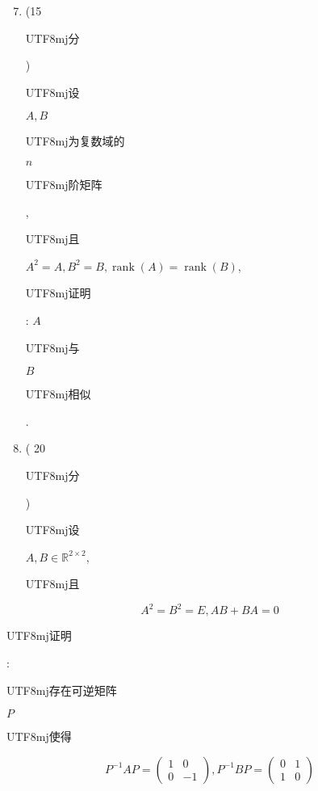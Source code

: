 \documentclass[10pt]{article}
\begin{document}
\begin{enumerate}
  \setcounter{enumi}{6}
  \item (15 \begin{CJK}{UTF8}{mj}分\end{CJK}) \begin{CJK}{UTF8}{mj}设\end{CJK} $A, B$ \begin{CJK}{UTF8}{mj}为复数域的\end{CJK} $n$ \begin{CJK}{UTF8}{mj}阶矩阵\end{CJK}, \begin{CJK}{UTF8}{mj}且\end{CJK} $A^{2}=A, B^{2}=B, \operatorname{rank}(A)=\operatorname{rank}(B)$, \begin{CJK}{UTF8}{mj}证明\end{CJK}: $A$ \begin{CJK}{UTF8}{mj}与\end{CJK} $B$ \begin{CJK}{UTF8}{mj}相似\end{CJK}.

  \item ( 20 \begin{CJK}{UTF8}{mj}分\end{CJK}) \begin{CJK}{UTF8}{mj}设\end{CJK} $A, B \in \mathbb{R}^{2 \times 2}$, \begin{CJK}{UTF8}{mj}且\end{CJK}

\end{enumerate}
$$
A^{2}=B^{2}=E, A B+B A=0
$$
\begin{CJK}{UTF8}{mj}证明\end{CJK}: \begin{CJK}{UTF8}{mj}存在可逆矩阵\end{CJK} $P$ \begin{CJK}{UTF8}{mj}使得\end{CJK}
$$
P^{-1} A P=\left(\begin{array}{cc}
1 & 0 \\
0 & -1
\end{array}\right), P^{-1} B P=\left(\begin{array}{ll}
0 & 1 \\
1 & 0
\end{array}\right)
$$
\end{document}

